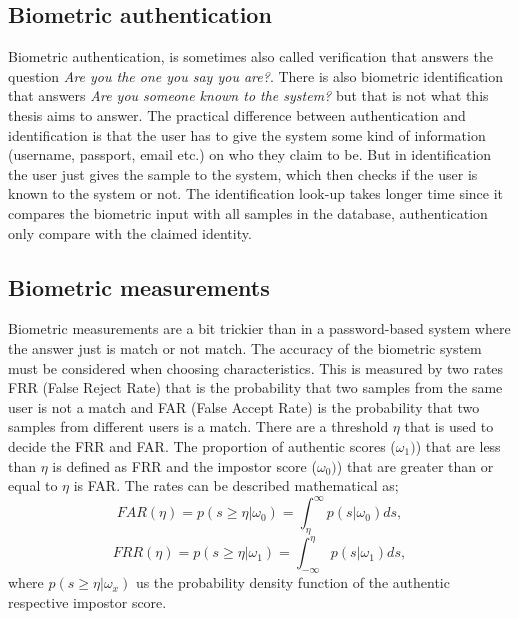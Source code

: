 \subsection{Biometric authentication}
Biometric authentication, is sometimes also called verification that answers the question \textit{Are you the one you say you are?}. There is also biometric identification that answers \textit{Are you someone known to the system?} but that is not what this thesis aims to answer. The practical difference between authentication and identification is that the user has to give the system some kind of information (username, passport, email etc.) on who they claim to be. But in identification the user just gives the sample to the system, which then checks if the user is known to the system or not. The identification look-up takes longer time since it compares the biometric input with all samples in the database, authentication only compare with the claimed identity. \cite[ch.~1]{introbio}

\subsection{Biometric measurements}\label{sec:bio:measure}
Biometric measurements are a bit trickier than in a password-based system where the answer just is match or not match. The accuracy of the biometric system must be considered when choosing characteristics. This is measured by two rates FRR (False Reject Rate) that is the probability that two samples from the same user is not a match and FAR (False Accept Rate) is the probability that two samples from different users is a match. 
There are a threshold $\eta$ that is used to decide the FRR and FAR. The proportion of authentic scores ($\omega_{1})$) that are less than $\eta$ is defined as FRR and the impostor score ($\omega_{0})$) that are greater than or equal to $\eta$ is FAR. The rates can be described mathematical as;
$$ FAR(\eta) = p(s\geq \eta | \omega_{0}) = \int_{\eta}^{\infty} p(s | \omega_{0}) ds, $$
$$ FRR(\eta) = p(s\geq \eta | \omega_{1}) = \int_{-\infty}^{\eta} p(s | \omega_{1}) ds, $$
where $p(s\geq \eta | \omega_{x})$ us the probability density function of the authentic respective impostor score. 
\cite[p.~18]{introbio}

